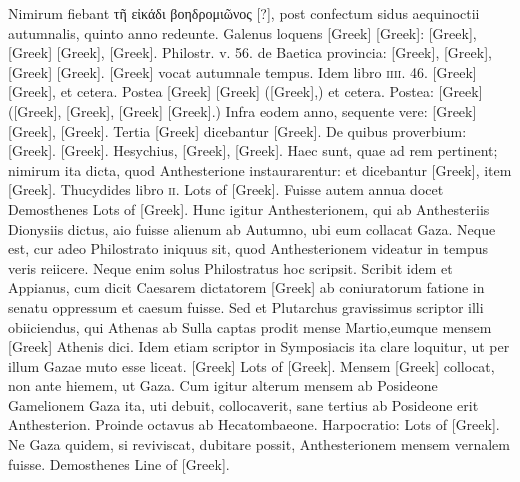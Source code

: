 Nimirum fiebant \textgreek{τῆ εἰκάδι βοηδρομιῶνος [?]},
 post confectum sidus aequinoctii
autumnalis, quinto anno redeunte.
Galenus loquens \textgreek{[Greek]}
\textgreek{[Greek]}: \textgreek{[Greek]},
 \textgreek{[Greek]}
\textgreek{[Greek]}, \textgreek{[Greek]}.
Philostr. v. 56. de
Baetica provincia: \textgreek{[Greek]}, \textgreek{[Greek]},
 \textgreek{[Greek]}
\textgreek{[Greek]}.
\textgreek{[Greek]} vocat autumnale tempus.
Idem libro \textsc{iiii}. 46. \textgreek{[Greek]}
\textgreek{[Greek]}, et cetera.
Postea \textgreek{[Greek]}
\textgreek{[Greek]} (\textgreek{[Greek]},) et cetera.
Postea:
\textgreek{[Greek]} (\textgreek{[Greek]}, \textgreek{[Greek]},
 \textgreek{[Greek]}
\textgreek{[Greek]}.)
Infra eodem anno, sequente vere: \textgreek{[Greek]}
\textgreek{[Greek]}, \textgreek{[Greek]}.
Tertia
\textgreek{[Greek]} dicebantur \textgreek{[Greek]}.
De quibus proverbium: \textgreek{[Greek]}.
\textgreek{[Greek]}.
Hesychius, \textgreek{[Greek]}, \textgreek{[Greek]}.
Haec sunt, quae ad rem
pertinent; nimirum ita dicta, quod Anthesterione instaurarentur: et
dicebantur \textgreek{[Greek]}, item \textgreek{[Greek]}.
Thucydides
libro \textsc{ii}.
\textgreek{Lots of [Greek]}.
Fuisse autem annua docet Demosthenes
\textgreek{Lots of [Greek]}.
Hunc igitur Anthesterionem, qui ab
Anthesteriis Dionysiis dictus, aio fuisse alienum ab Autumno, ubi
eum collacat Gaza.
Neque est, cur adeo Philostrato iniquus sit, quod
Anthesterionem videatur in tempus veris reiicere.
Neque enim solus
Philostratus hoc scripsit.
Scribit idem et Appianus, cum dicit Caesarem
dictatorem \textgreek{[Greek]} ab coniuratorum fatione in senatu
oppressum et caesum fuisse.
Sed et Plutarchus gravissimus scriptor illi
obiiciendus, qui Athenas ab Sulla captas prodit mense Martio,eumque
mensem \textgreek{[Greek]} Athenis dici.
Idem etiam scriptor in Symposiacis
ita clare loquitur, ut per illum Gazae muto esse liceat.
 \textgreek{[Greek]}
\textgreek{Lots of [Greek]}.
Mensem
\textgreek{[Greek]} collocat, non ante hiemem, ut Gaza.
Cum
igitur alterum mensem ab Posideone Gamelionem Gaza ita, uti debuit,
collocaverit, sane tertius ab Posideone erit Anthesterion.
Proinde octavus
ab Hecatombaeone.
Harpocratio: \textgreek{Lots of [Greek]}.
Ne Gaza quidem, si reviviscat, dubitare
possit, Anthesterionem mensem vernalem fuisse.
Demosthenes
\textgreek{Line of [Greek]}.

